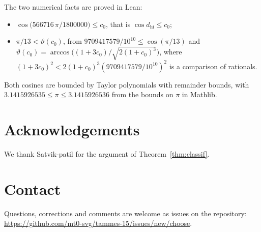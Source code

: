 \documentclass[12pt]{amsart}
\newcommand{\repo}{https://github.com/mt0-svg/tammes-15}
\theoremstyle{definition}
\theoremstyle{plain}
\theoremstyle{definition}
\newcommand{\dhi}{d_{\mathrm{hi}}}
\begin{document}
The two numerical facts are proved in Lean:
\begin{itemize}
\item[N1.] $\cos\bigl(566716\,\pi/1800000\bigr)\le c_0$, that is $\cos\dhi\le c_0$;
\item[N2.] $\pi/13<\vartheta(c_0)$, from $9709417579/10^{10}\le\cos(\pi/13)$ and $\vartheta(c_0)=\arccos\bigl((1+3c_0)/\sqrt{2(1+c_0)^3}\bigr)$, where $(1+3c_0)^2<2(1+c_0)^3(9709417579/10^{10})^2$ is a comparison of rationals.
\end{itemize}
Both cosines are bounded by Taylor polynomials with remainder bounds, with $3.1415926535\le\pi\le3.1415926536$ from the bounds on $\pi$ in Mathlib.

\section*{Acknowledgements}
We thank Satvik-patil for the argument of Theorem~\ref{thm:classif}.

\section*{Contact}
Questions, corrections and comments are welcome as issues on the repository: \url{\repo/issues/new/choose}.
\end{document}
